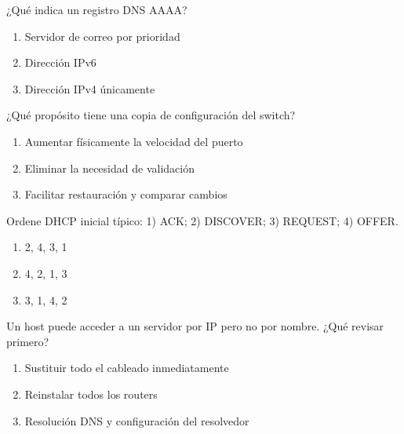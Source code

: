 \noindent\begin{minipage}{\linewidth}\setlength{\parskip}{4pt}\label{q:R-036}
¿Qué indica un registro DNS AAAA?
\begin{enumerate}[label=\Alph*),nosep]
\item Servidor de correo por prioridad
\item Dirección IPv6
\item Dirección IPv4 únicamente
\end{enumerate}\end{minipage}\par\medskip

\noindent\begin{minipage}{\linewidth}\setlength{\parskip}{4pt}\label{q:R-037}
¿Qué propósito tiene una copia de configuración del switch?
\begin{enumerate}[label=\Alph*),nosep]
\item Aumentar físicamente la velocidad del puerto
\item Eliminar la necesidad de validación
\item Facilitar restauración y comparar cambios
\end{enumerate}\end{minipage}\par\medskip

\noindent\begin{minipage}{\linewidth}\setlength{\parskip}{4pt}\label{q:R-038}
Ordene DHCP inicial típico: 1) ACK; 2) DISCOVER; 3) REQUEST; 4) OFFER.
\begin{enumerate}[label=\Alph*),nosep]
\item 2, 4, 3, 1
\item 4, 2, 1, 3
\item 3, 1, 4, 2
\end{enumerate}\end{minipage}\par\medskip

\noindent\begin{minipage}{\linewidth}\setlength{\parskip}{4pt}\label{q:R-039}
Un host puede acceder a un servidor por IP pero no por nombre. ¿Qué revisar primero?
\begin{enumerate}[label=\Alph*),nosep]
\item Sustituir todo el cableado inmediatamente
\item Reinstalar todos los routers
\item Resolución DNS y configuración del resolvedor
\end{enumerate}\end{minipage}\par\medskip

